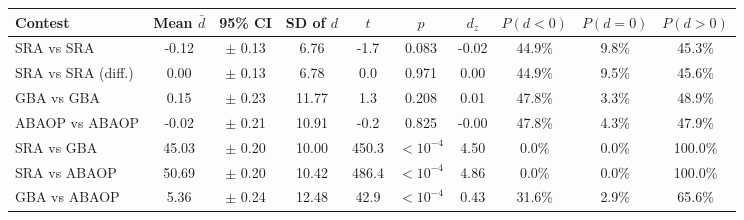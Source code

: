 \begin{tabular}{|l|c|c|c|c|c|c|c|c|c|}
\hline
\rowcolor{blue!20}
Contest & Mean $\bar d$ & 95\% CI & SD of $d$ & $t$ & $p$ & $d_z$ & $P(d\!<\!0)$ & $P(d\!=\!0)$ & $P(d\!>\!0)$ \\ \hline
SRA vs SRA & -0.12 & $\pm$ 0.13 & 6.76 & -1.7 & 0.083 & -0.02 & 44.9\% & 9.8\% & 45.3\% \\ \hline
SRA vs SRA (diff.) & 0.00 & $\pm$ 0.13 & 6.78 & 0.0 & 0.971 & 0.00 & 44.9\% & 9.5\% & 45.6\% \\ \hline
GBA vs GBA & 0.15 & $\pm$ 0.23 & 11.77 & 1.3 & 0.208 & 0.01 & 47.8\% & 3.3\% & 48.9\% \\ \hline
ABAOP vs ABAOP & -0.02 & $\pm$ 0.21 & 10.91 & -0.2 & 0.825 & -0.00 & 47.8\% & 4.3\% & 47.9\% \\ \hline
SRA vs GBA & 45.03 & $\pm$ 0.20 & 10.00 & 450.3 & $<10^{-4}$ & 4.50 & 0.0\% & 0.0\% & 100.0\% \\ \hline
SRA vs ABAOP & 50.69 & $\pm$ 0.20 & 10.42 & 486.4 & $<10^{-4}$ & 4.86 & 0.0\% & 0.0\% & 100.0\% \\ \hline
GBA vs ABAOP & 5.36 & $\pm$ 0.24 & 12.48 & 42.9 & $<10^{-4}$ & 0.43 & 31.6\% & 2.9\% & 65.6\% \\ \hline
\end{tabular}
